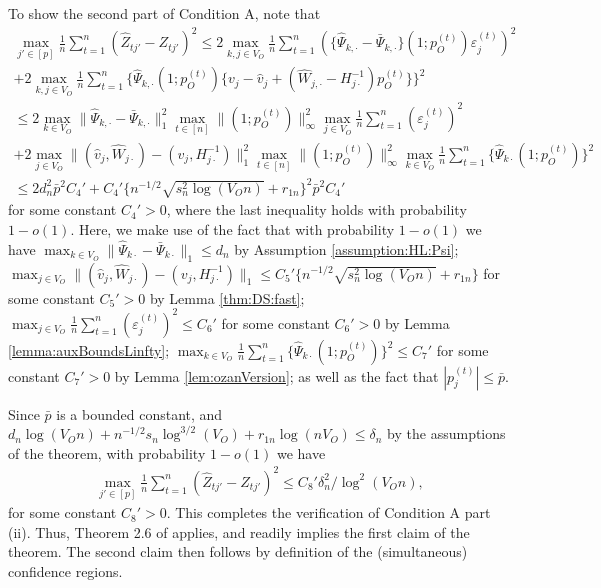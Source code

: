 \documentclass[opre,nonblindrev]{informs3} %
\begin{document}
\begin{APPENDIX}{}
	To show the second part of Condition A, note that
	$$
	\begin{array}{l}
	{\displaystyle\max_{j'\in[p]}}\frac{1}{n}\sum_{t=1}^n(\hat Z_{tj'}-Z_{tj'})^2 \leq 2\max_{k,j\in V_O} \frac{1}{n}\sum_{t=1}^n (\{\hat\Psi_{k,\cdot}-\bar\Psi_{k,\cdot}\}(1;p_O^{(t)})\varepsilon_j^{(t)})^2\\
	+ 2\max_{k,j\in V_O} \frac{1}{n}\sum_{t=1}^n \{\hat \Psi_{k,\cdot}(1;p_O^{(t)})\{v_j-\hat v_j +(\hat W_{j,\cdot}-H^{-1}_{j\cdot})p_O^{(t)}\}\}^2 \\
	\leq 2\max_{k\in V_O} \|\hat\Psi_{k,\cdot}-\bar\Psi_{k,\cdot}\|_1^2\max_{t\in[n]}\|(1;p_O^{(t)})\|_\infty^2\max_{j\in V_O}\frac{1}{n}\sum_{t=1}^n (\varepsilon_j^{(t)})^2\\
	+ 2\max_{j\in V_O}\|(\hat v_j,\hat W_{j\cdot})-(v_j,H^{-1}_{j\cdot})\|_1^2\max_{t\in[n]}\|(1;p_O^{(t)})\|_\infty^2\max_{k\in V_O} \frac{1}{n}\sum_{t=1}^n \{\hat\Psi_{k\cdot}(1;p_O^{(t)})\}^2\\
	\leq 2 d_n^2 \bar p^2 C_4' + C_4'\{ n^{-1/2}\sqrt{s_n^2\log(V_On)}+r_{1n}\}^2\bar p^2 C_4'
	\end{array}$$
	for some constant $C_4'>0$,
	where the last inequality holds with probability $1-o(1)$.
	Here, we make use of the fact that
	 with probability $1-o(1)$  we have
 $\max_{k\in V_O} \|\hat\Psi_{k\cdot}-\bar\Psi_{k\cdot}\|_1\leq d_n$ by Assumption \ref{assumption:HL:Psi};  $\max_{j\in V_O}\|(\hat v_j,\hat W_{j\cdot})-(v_j,H^{-1}_{j\cdot})\|_1\leq C_5'\{n^{-1/2}\sqrt{s_n^2\log(V_On)}+r_{1n}\}$
	for some constant $C_5'>0$  by Lemma \ref{thm:DS:fast};  $\max_{j\in V_O}\frac{1}{n}\sum_{t=1}^n (\varepsilon_j^{(t)})^2\leq C_6'$ 
	for some constant $C_6'>0$
	by Lemma \ref{lemma:auxBoundsLinfty}; $\max_{k\in V_O} \frac{1}{n}\sum_{t=1}^n \{\hat\Psi_{k\cdot}(1;p_O^{(t)})\}^2 \leq C_7'$
	for some constant $C_7'>0$
	 by Lemma \ref{lem:ozanVersion};
as well as  the fact that
	  $|p_j^{(t)}|\leq \bar p$.
	
Since $\bar p$ is a bounded constant,  and $d_n\log(V_On) + n^{-1/2}s_n\log^{3/2}(V_O)+r_{1n}\log(nV_O)\leq \delta_n$ by the assumptions of the theorem,
	with probability $1-o(1)$ we have$$
	\begin{array}{l}
	{\displaystyle\max_{j'\in[p]}}\frac{1}{n}\sum_{t=1}^n(\hat Z_{tj'}-Z_{tj'})^2 \leq C_8'\delta_n^2/\log^2(V_On),
	\end{array}
	$$
	for some constant $C_8'>0$.
	This completes the verification of Condition A part (ii).
	Thus, Theorem 2.6 of \cite{belloni2018high}
	applies, and readily implies the first claim of the theorem. The second claim then follows by definition of the (simultaneous) confidence regions.
	\hfill 
	\Halmos
	\endproof
	






\end{APPENDIX}
\end{document}
